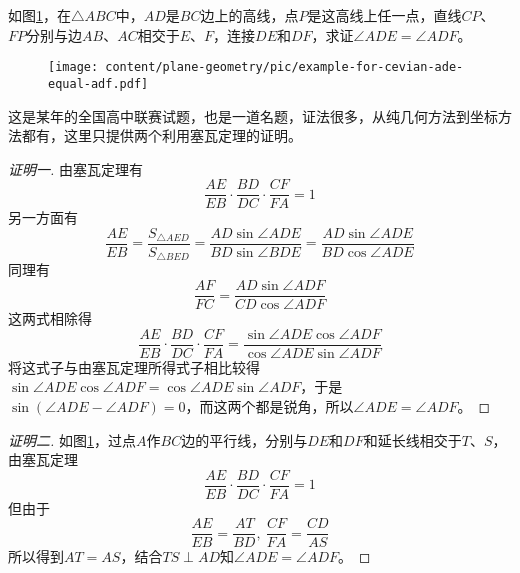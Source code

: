 \begin{example}
 如图\ref{fig:example-for-cevian-ade-equal-adf}，在$\triangle ABC$中，$AD$是$BC$边上的高线，点$P$是这高线上任一点，直线$CP$、$FP$分别与边$AB$、$AC$相交于$E$、$F$，连接$DE$和$DF$，求证$\angle ADE = \angle ADF$。

\begin{figure}[htbp]
\centering
\texttt{[image: content/plane-geometry/pic/example-for-cevian-ade-equal-adf.pdf]}
\caption{}
\label{fig:example-for-cevian-ade-equal-adf}
\end{figure}

这是某年的全国高中联赛试题，也是一道名题，证法很多，从纯几何方法到坐标方法都有，这里只提供两个利用塞瓦定理的证明。

\begin{proof}[证明一]
由塞瓦定理有
\begin{equation*}
  \frac{AE}{EB} \cdot \frac{BD}{DC} \cdot \frac{CF}{FA} = 1
\end{equation*}
另一方面有
\begin{equation*}
  \frac{AE}{EB} = \frac{S_{\triangle AED}}{S_{\triangle BED}} = \frac{AD \sin{\angle ADE}}{BD \sin{\angle BDE}} = \frac{AD \sin{\angle ADE}}{BD \cos{\angle ADE}}
\end{equation*}
同理有
\begin{equation*}
  \frac{AF}{FC} = \frac{AD \sin{\angle ADF}}{CD \cos{\angle ADF}}
\end{equation*}
这两式相除得
\begin{equation*}
  \frac{AE}{EB} \cdot \frac{BD}{DC} \cdot \frac{CF}{FA} = \frac{\sin{\angle ADE} \cos{\angle ADF}}{\cos{\angle ADE} \sin{\angle ADF}} 
\end{equation*}
将这式子与由塞瓦定理所得式子相比较得$\sin{\angle ADE} \cos{\angle ADF} = \cos{\angle ADE} \sin{\angle ADF}$，于是$\sin{(\angle ADE - \angle ADF)} = 0$，而这两个都是锐角，所以$\angle ADE = \angle ADF$。
\end{proof}

\begin{proof}[证明二]
  如图\ref{fig:example-for-cevian-ade-equal-adf}，过点$A$作$BC$边的平行线，分别与$DE$和$DF$和延长线相交于$T$、$S$，由塞瓦定理
  \begin{equation*}
    \frac{AE}{EB} \cdot \frac{BD}{DC} \cdot \frac{CF}{FA} = 1
  \end{equation*}
  但由于
  \begin{equation*}
    \frac{AE}{EB} = \frac{AT}{BD}, \  \frac{CF}{FA} = \frac{CD}{AS}
  \end{equation*}
  所以得到$AT = AS$，结合$TS \perp AD$知$\angle ADE = \angle ADF$。
\end{proof}
\end{example}

